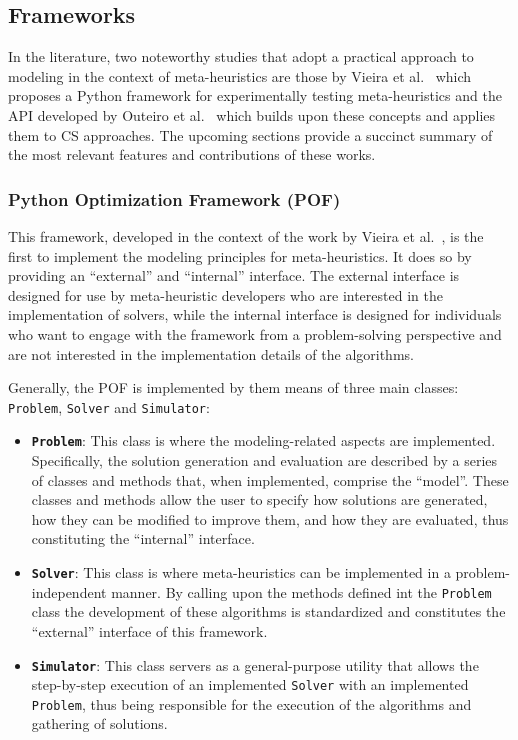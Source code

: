 \subsection{Frameworks}

In the literature, two noteworthy studies that adopt a practical approach to
modeling in the context of meta-heuristics are those by Vieira et
al.~\cite{vieira2009uma} which proposes a Python framework for experimentally
testing meta-heuristics and the API developed by Outeiro et
al.~\cite{outeiro2021application} which builds upon these concepts and applies
them to CS approaches. The upcoming sections provide a succinct summary of the
most relevant features and contributions of these works.

\subsubsection{Python Optimization Framework (POF)}

This framework, developed in the context of the work by Vieira et
al.~\cite{vieira2009uma}, is the first to implement the modeling principles for
meta-heuristics. It does so by providing an ``external'' and ``internal'' interface.
The external interface is designed for use by meta-heuristic developers who are
interested in the implementation of solvers, while the internal interface is
designed for individuals who want to engage with the framework from a
problem-solving perspective and are not interested in the implementation details
of the algorithms.

Generally, the POF is implemented by  them means of three main classes:
\texttt{Problem}, \texttt{Solver} and \texttt{Simulator}:

\begin{itemize}
  \item \textbf{\texttt{Problem}}: This class is where the modeling-related
        aspects are implemented. Specifically, the solution generation and
        evaluation are described by a series of classes and methods that, when
        implemented, comprise the ``model''. These classes and methods allow the user
        to specify how solutions are generated, how they can be modified to improve
        them, and how they are evaluated, thus constituting the ``internal'' interface.
  \item \textbf{\texttt{Solver}}: This class is where meta-heuristics can be implemented in
        a problem-independent manner. By calling upon the methods defined int the \texttt{Problem}
        class the development of these algorithms is standardized and constitutes the ``external''
        interface of this framework.
  \item \textbf{\texttt{Simulator}}: This class servers as a general-purpose utility
        that allows the step-by-step execution of an implemented \texttt{Solver} with an
        implemented \texttt{Problem}, thus being responsible for the execution of the
        algorithms and gathering of solutions.
\end{itemize}

